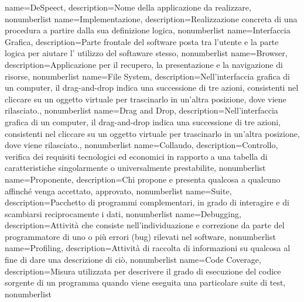\usepackage{glossaries}
\usepackage[utf8x]{inputenc}
\usepackage[italian]{babel}

\makeglossaries

{
	name={DeSpeect},
	description={Nome della applicazione da realizzare},
	nonumberlist 
}
{
	name={Implementazione},
	description={Realizzazione concreta di una procedura a partire dalla sua definizione logica},
	nonumberlist 
}
{
name={Interfaccia Grafica},
description={Parte frontale del software posta tra l'utente e la parte logica per aiutare l' utilizzo del softaware stesso},
nonumberlist 
}
{
name={Browser},
description={Applicazione per il recupero, la presentazione e la navigazione di risorse},
nonumberlist 
}
{
name={File System},
description={Nell'interfaccia grafica di un computer, il drag-and-drop indica una successione di tre azioni, consistenti nel cliccare su un oggetto virtuale per trascinarlo in un'altra posizione, dove viene rilasciato.},
nonumberlist 
}
{
name={Drag and Drop},
description={Nell'interfaccia grafica di un computer, il drag-and-drop indica una successione di tre azioni, consistenti nel cliccare su un oggetto virtuale per trascinarlo in un'altra posizione, dove viene rilasciato.},
nonumberlist 
}
{
	name={Collaudo},
	description={Controllo, verifica dei requisiti tecnologici ed economici in rapporto a una tabella di caratteristiche singolarmente o universalmente prestabilite},
	nonumberlist 
}
{
	name={Proponente},
	description={Chi propone e presenta qualcosa a qualcuno affinché venga accettato, approvato},
	nonumberlist 
}
{
	name={Suite},
	description={Pacchetto di programmi complementari, in grado di interagire e di scambiarsi reciprocamente i dati},
	nonumberlist 
}
{
	name={Debugging},
	description={Attività che consiste nell'individuazione e correzione da parte del programmatore di uno o più errori (bug) rilevati nel software},
	nonumberlist 
}
{
	name={Profiling},
	description={Attività di raccolta di informazioni su qualcosa al fine di dare una descrizione di ciò},
	nonumberlist 
}
{
	name={Code Coverage},
	description={Misura utilizzata per descrivere il grado di esecuzione del codice sorgente di un programma quando viene eseguita una particolare suite di test},
	nonumberlist 
}
